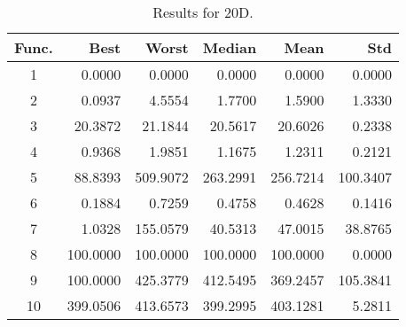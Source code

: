 \begin{table}[ht]
\centering
\caption{ Results for 20D. }
\label{tab:20D}
\begin{tabular}{crrrrr}
\hline
{Func.} & Best & Worst & Median & Mean & Std \\
\hline
1 & 0.0000 & 0.0000 & 0.0000 & 0.0000 & 0.0000 \\
2 & 0.0937 & 4.5554 & 1.7700 & 1.5900 & 1.3330 \\
3 & 20.3872 & 21.1844 & 20.5617 & 20.6026 & 0.2338 \\
4 & 0.9368 & 1.9851 & 1.1675 & 1.2311 & 0.2121 \\
5 & 88.8393 & 509.9072 & 263.2991 & 256.7214 & 100.3407 \\
6 & 0.1884 & 0.7259 & 0.4758 & 0.4628 & 0.1416 \\
7 & 1.0328 & 155.0579 & 40.5313 & 47.0015 & 38.8765 \\
8 & 100.0000 & 100.0000 & 100.0000 & 100.0000 & 0.0000 \\
9 & 100.0000 & 425.3779 & 412.5495 & 369.2457 & 105.3841 \\
10 & 399.0506 & 413.6573 & 399.2995 & 403.1281 & 5.2811 \\
\hline
\end{tabular}
\end{table}
